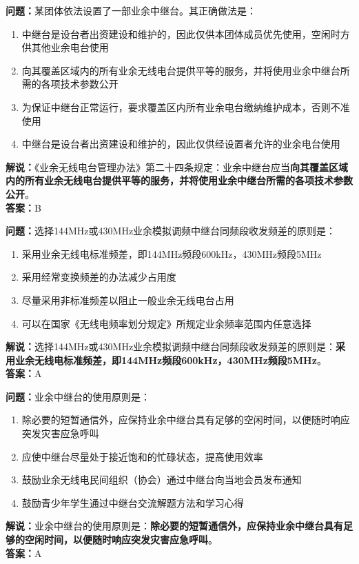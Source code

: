 \bigskip


\noindent\textbf{问题：}某团体依法设置了一部业余中继台。其正确做法是：
\begin{enumerate}[label=\Alph*), leftmargin=3em]
	\item 中继台是设台者出资建设和维护的，因此仅供本团体成员优先使用，空闲时方供其他业余电台使用
	\item 向其覆盖区域内的所有业余无线电台提供平等的服务，并将使用业余中继台所需的各项技术参数公开
	\item 为保证中继台正常运行，要求覆盖区内所有业余电台缴纳维护成本，否则不准使用
	\item 中继台是设台者出资建设和维护的，因此仅供经设置者允许的业余电台使用
\end{enumerate}
\noindent\textbf{解说：}《业余无线电台管理办法》第二十四条规定：业余中继台应当\textbf{向其覆盖区域内的所有业余无线电台提供平等的服务，并将使用业余中继台所需的各项技术参数公开}。\\\noindent\textbf{答案：}B



\bigskip


\noindent\textbf{问题：}选择144MHz或430MHz业余模拟调频中继台同频段收发频差的原则是：
\begin{enumerate}[label=\Alph*), leftmargin=3em]
	\item 采用业余无线电标准频差，即144MHz频段600kHz，430MHz频段5MHz
	\item 采用经常变换频差的办法减少占用度
	\item 尽量采用非标准频差以阻止一般业余无线电台占用
	\item 可以在国家《无线电频率划分规定》所规定业余频率范围内任意选择
\end{enumerate}
\noindent\textbf{解说：}选择144MHz或430MHz业余模拟调频中继台同频段收发频差的原则是：\textbf{采用业余无线电标准频差，即144MHz频段600kHz，430MHz频段5MHz}。\\\noindent\textbf{答案：}A



\bigskip


\noindent\textbf{问题：}业余中继台的使用原则是：
\begin{enumerate}[label=\Alph*), leftmargin=3em]
	\item 除必要的短暂通信外，应保持业余中继台具有足够的空闲时间，以便随时响应突发灾害应急呼叫
	\item 应使中继台尽量处于接近饱和的忙碌状态，提高使用效率
	\item 鼓励业余无线电民间组织（协会）通过中继台向当地会员发布通知
	\item 鼓励青少年学生通过中继台交流解题方法和学习心得
\end{enumerate}
\noindent\textbf{解说：}业余中继台的使用原则是：\textbf{除必要的短暂通信外，应保持业余中继台具有足够的空闲时间，以便随时响应突发灾害应急呼叫}。\\\noindent\textbf{答案：}A



